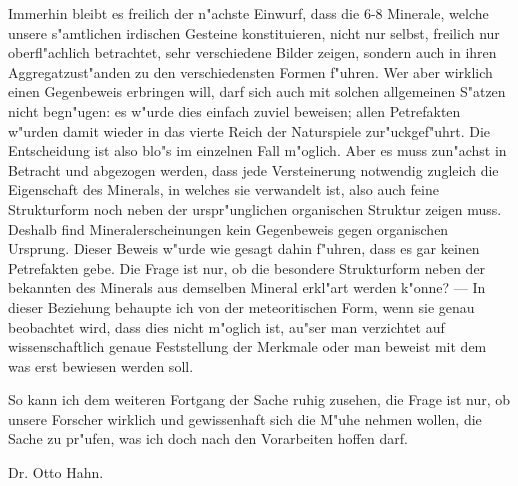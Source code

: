 \documentclass[a4paper, 12pt, oneside]{article}
\begin{document}
Immerhin bleibt es freilich der n"achste Einwurf, dass die 6-8 Minerale, welche unsere s"amtlichen irdischen Gesteine konstituieren, nicht nur selbst, freilich nur oberfl"achlich betrachtet, sehr verschiedene Bilder zeigen, sondern auch in ihren Aggregatzust"anden zu den verschiedensten Formen f"uhren. Wer aber wirklich einen Gegenbeweis erbringen will, darf sich auch mit solchen allgemeinen S"atzen nicht begn"ugen: es w"urde dies einfach zuviel beweisen; allen Petrefakten w"urden damit wieder in das vierte Reich der Naturspiele zur"uckgef"uhrt. Die Entscheidung ist also blo"s im einzelnen Fall m"oglich. Aber es muss zun"achst in Betracht und abgezogen werden, dass jede Versteinerung notwendig zugleich die Eigenschaft des Minerals, in welches sie verwandelt ist, also auch feine Strukturform noch neben der urspr"unglichen organischen Struktur zeigen muss. Deshalb find Mineralerscheinungen kein Gegenbeweis gegen organischen Ursprung. Dieser Beweis w"urde wie gesagt dahin f"uhren, dass es gar keinen Petrefakten gebe. Die Frage ist nur, ob die besondere Strukturform neben der bekannten des Minerals aus demselben Mineral erkl"art werden k"onne? --- In dieser Beziehung behaupte ich von der meteoritischen Form, wenn sie genau beobachtet wird, dass dies nicht m"oglich ist, au"ser man verzichtet auf wissenschaftlich genaue Feststellung der Merkmale oder man beweist mit dem was erst bewiesen werden soll.

So kann ich dem weiteren Fortgang der Sache ruhig zusehen, die Frage ist nur, ob unsere Forscher wirklich und gewissenhaft sich die M"uhe nehmen wollen, die Sache zu pr"ufen, was ich doch nach den Vorarbeiten hoffen darf.

Dr. Otto Hahn.
\end{document}
